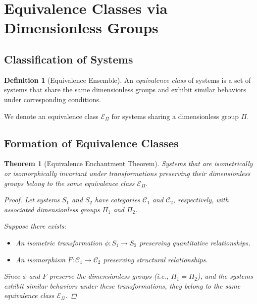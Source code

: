 \documentclass{article}
\newtheorem{theorem}{Theorem}[section]
\theoremstyle{definition}
\newtheorem{definition}{Definition}[section]
\theoremstyle{remark}
\begin{document}
	\section{Equivalence Classes via Dimensionless Groups}
	
	\subsection{Classification of Systems}
	
	\begin{definition}[Equivalence Ensemble]
		An \emph{equivalence class} of systems is a set of systems that share the same dimensionless groups and exhibit similar behaviors under corresponding conditions.
		
		We denote an equivalence class $\mathcal{E}_\Pi$ for systems sharing a dimensionless group $\Pi$.
	\end{definition}
	
	\subsection{Formation of Equivalence Classes}
	
	\begin{theorem}[Equivalence Enchantment Theorem]
		Systems that are isometrically or isomorphically invariant under transformations preserving their dimensionless groups belong to the same equivalence class $\mathcal{E}_\Pi$.
		
		\begin{proof}
			Let systems $S_1$ and $S_2$ have categories $\mathcal{C}_1$ and $\mathcal{C}_2$, respectively, with associated dimensionless groups $\Pi_1$ and $\Pi_2$.
			
			Suppose there exists:
			\begin{itemize}
				\item An isometric transformation $\phi: S_1 \rightarrow S_2$ preserving quantitative relationships.
				\item An isomorphism $F: \mathcal{C}_1 \rightarrow \mathcal{C}_2$ preserving structural relationships.
			\end{itemize}
			
			Since $\phi$ and $F$ preserve the dimensionless groups (i.e., $\Pi_1 = \Pi_2$), and the systems exhibit similar behaviors under these transformations, they belong to the same equivalence class $\mathcal{E}_\Pi$.
		\end{proof}
	\end{theorem}
	
\end{document}
